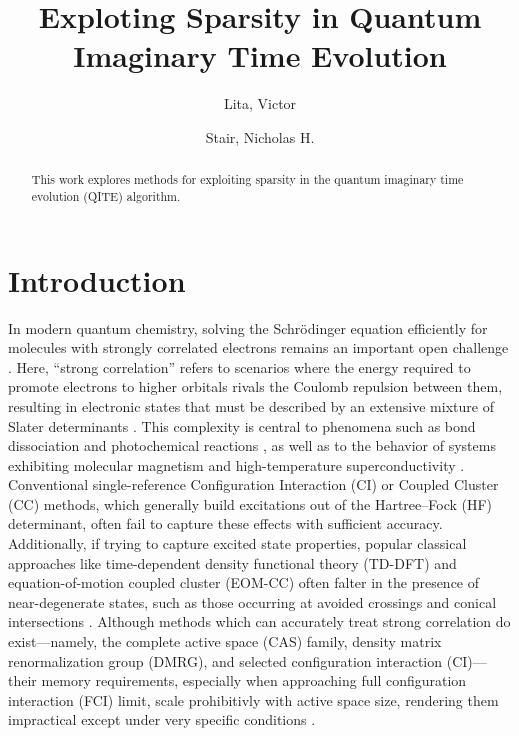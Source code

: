 \documentclass[aip,jcp,amsmath,amssymb, reprint]{revtex4-1}
\begin{document}
\title{Exploting Sparsity in Quantum Imaginary Time Evolution}
\author{Lita, Victor}
\author{Stair, Nicholas H.}

\begin{abstract}
This work explores methods for exploiting sparsity in the quantum imaginary time evolution (QITE) algorithm. 

\end{abstract}

\linenumbersep=24pt

\maketitle

\section{\label{sec:intro}Introduction}


In modern quantum chemistry, solving the Schrödinger equation efficiently for molecules with strongly correlated electrons remains an important open challenge \cite{9,10}. 
Here, “strong correlation” refers to scenarios where the energy required to promote electrons to higher orbitals rivals the Coulomb repulsion between them, resulting in electronic states that must be described by an extensive mixture of Slater determinants \cite{9,10}. 
This complexity is central to phenomena such as bond dissociation and photochemical reactions \cite{1,2}, as well as to the behavior of systems exhibiting molecular magnetism \cite{3} and high-temperature superconductivity \cite{4}. 
Conventional single-reference Configuration Interaction (CI) or Coupled Cluster (CC) methods, which generally build excitations out of the Hartree--Fock (HF) determinant, often fail to capture these effects with sufficient accuracy.
Additionally, if trying to capture excited state properties, popular classical approaches like time-dependent density functional theory (TD-DFT) \cite{4,5} and equation-of-motion coupled cluster (EOM-CC) \cite{6,7} often falter in the presence of near-degenerate states, such as those occurring at avoided crossings and conical intersections \cite{1,2,3,8,9,10}. 
Although methods which can accurately treat strong correlation do exist—namely, the complete active space (CAS) family, density matrix renormalization group (DMRG),  and selected configuration interaction (CI)— their  memory requirements, especially when approaching full configuration interaction (FCI) limit, scale prohibitivly with active space size, rendering them impractical except under very specific conditions \cite{11,12-18,19-28,29-35,36-44,46-56,57-60,61,62}.
\end{document}
